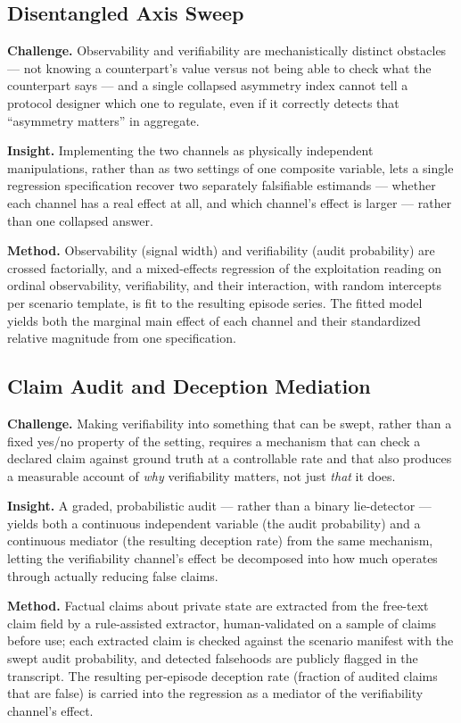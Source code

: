 \documentclass[11pt]{article}
\begin{document}
\subsection{Disentangled Axis Sweep}
\textbf{Challenge.} Observability and verifiability are mechanistically distinct obstacles --- not knowing a counterpart's value versus not being able to check what the counterpart says --- and a single collapsed asymmetry index cannot tell a protocol designer which one to regulate, even if it correctly detects that ``asymmetry matters'' in aggregate.

\textbf{Insight.} Implementing the two channels as physically independent manipulations, rather than as two settings of one composite variable, lets a single regression specification recover two separately falsifiable estimands --- whether each channel has a real effect at all, and which channel's effect is larger --- rather than one collapsed answer.

\textbf{Method.} Observability (signal width) and verifiability (audit probability) are crossed factorially, and a mixed-effects regression of the exploitation reading on ordinal observability, verifiability, and their interaction, with random intercepts per scenario template, is fit to the resulting episode series. The fitted model yields both the marginal main effect of each channel and their standardized relative magnitude from one specification.

\subsection{Claim Audit and Deception Mediation}
\textbf{Challenge.} Making verifiability into something that can be swept, rather than a fixed yes/no property of the setting, requires a mechanism that can check a declared claim against ground truth at a controllable rate and that also produces a measurable account of \emph{why} verifiability matters, not just \emph{that} it does.

\textbf{Insight.} A graded, probabilistic audit --- rather than a binary lie-detector --- yields both a continuous independent variable (the audit probability) and a continuous mediator (the resulting deception rate) from the same mechanism, letting the verifiability channel's effect be decomposed into how much operates through actually reducing false claims.

\textbf{Method.} Factual claims about private state are extracted from the free-text claim field by a rule-assisted extractor, human-validated on a sample of claims before use; each extracted claim is checked against the scenario manifest with the swept audit probability, and detected falsehoods are publicly flagged in the transcript. The resulting per-episode deception rate (fraction of audited claims that are false) is carried into the regression as a mediator of the verifiability channel's effect.
\end{document}
